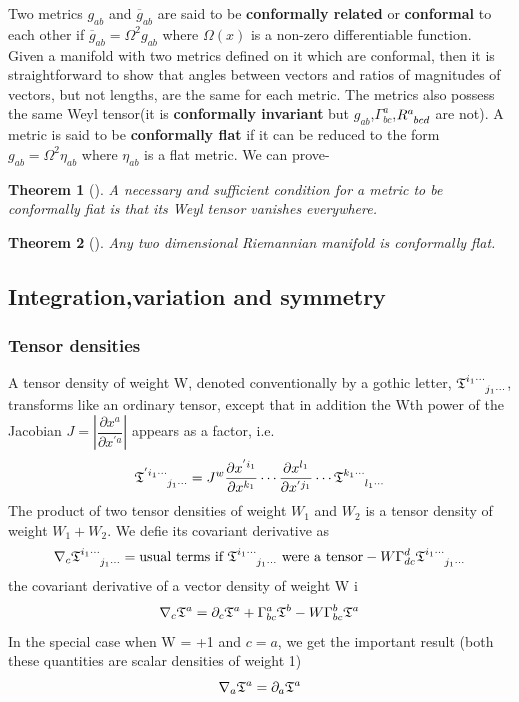 \documentclass[12pt,a4paper]{article}
\numberwithin{table}{section}
\numberwithin{figure}{section}
\numberwithin{equation}{section}
\newtheorem{theorem}{Theorem}[section]
\theoremstyle{remark}
\theoremstyle{definition}
\begin{document}
Two metrics $g_{ab}$ and $\overline{g}_{ab}$ are said to be \textbf{conformally related} or \textbf{conformal} to each other if $\overline{g}_{ab}=\Omega^2 g_{ab} $ where $\Omega(x)$ is a non-zero differentiable function. Given a manifold with two metrics defined on it which are conformal, then it is straightforward to show that angles between vectors and ratios of magnitudes 
of vectors, but not lengths, are the same for each metric. The metrics also possess the same Weyl tensor(it is \textbf{conformally invariant} but $g_{ab}$,$\Gamma^a_{bc}$,$\tensor{R}{^a_{bcd}}$  are not). A metric is said to be \textbf{conformally flat} if it can be reduced to the form $g_{ab}=\Omega^2 \eta_{ab} $ where $\eta_{ab}$ is a flat metric. We can prove-
\begin{theorem}[]
A necessary and sufficient condition for a metric to be conformally fiat is that its Weyl tensor vanishes everywhere. 
\end{theorem}
\begin{theorem}[]
Any two dimensional Riemannian manifold is conformally flat.
\end{theorem}


\subsection{Integration,variation and symmetry}
\subsubsection*{Tensor densities}
A tensor density of weight W, denoted conventionally by a gothic letter, 
$\tensor{\mathfrak{T}}{^{i_1\cdots}_{j_1\cdots}}$, transforms like an ordinary tensor, except that in addition the Wth 
power of the Jacobian $J=\left|\dfrac{\partial x^a}{\partial x^{'a}}\right|$ appears as a factor, i.e.
$$\tensor{\mathfrak{T}}{^{'i_1\cdots}_{j_1\cdots}}=J^w\dfrac{\partial x^{'i_1}}{\partial x^{k_1}}\cdots\dfrac{\partial x^{l_1}}{\partial x^{'j_1}}\cdots \tensor{\mathfrak{T}}{^{k_1\cdots}_{l_1\cdots}}$$
The product of two tensor densities of weight $W_1$ and $W_2$ is a tensor 
density of weight $W_1+W_2$. We defie its covariant derivative as
$$\nabla_c\tensor{\mathfrak{T}}{^{i_1\cdots}_{j_1\cdots}}=\text{usual terms if }\tensor{\mathfrak{T}}{^{i_1\cdots}_{j_1\cdots}}\text{ were a tensor}-W\Gamma^d_{dc}\tensor{\mathfrak{T}}{^{i_1\cdots}_{j_1\cdots}} $$
the covariant derivative of a vector density of weight W i
$$\nabla_c\tensor{\mathfrak{T}}{^{a}}=\partial_c\tensor{\mathfrak{T}}{^{a}}+\Gamma^a_{bc}\tensor{\mathfrak{T}}{^{b}}-W\Gamma^b_{bc}\tensor{\mathfrak{T}}{^{a}} $$
In the special case when W = +1 and $c=a$, we get the important result (both these quantities are scalar densities of weight 1)
$$ \nabla_a\tensor{\mathfrak{T}}{^{a}}=\partial_a\tensor{\mathfrak{T}}{^{a}}$$
\end{document}
